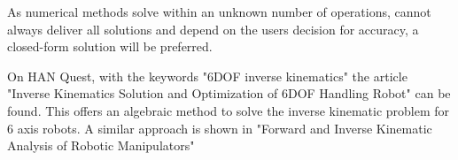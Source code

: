 \medskip

As numerical methods solve within an unknown number of operations, cannot always deliver  all solutions and depend on the users decision for accuracy, \cite{invKinSeriallinkMani} a closed-form solution will be preferred.

On HAN Quest, with the keywords "6DOF inverse kinematics" the article "Inverse Kinematics Solution and Optimization of 6DOF Handling Robot" \cite{invKinSolYanWu} can be found. This offers an  algebraic method to solve the inverse kinematic problem for 6 axis robots.
A similar approach is shown in "Forward and Inverse Kinematic Analysis of Robotic Manipulators" \cite{FwdInvAnalysRobManip}\\

